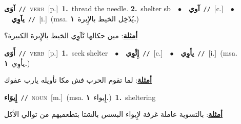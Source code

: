\documentclass[10pt,a4paper,twoside]{article} %
\begin{document}
\begin{multicols}{2}
{\setlength\topsep{0pt}\textbf{\foreignlanguage{arabic}{آوَى}}\ {\color{gray}\texttt{//}\color{black}}\ \textsc{verb}\ [p.]\ \textbf{1.}~thread the needle.  \textbf{2.}~shelter sb\ \ $\bullet$\ \ \setlength\topsep{0pt}\textbf{\foreignlanguage{arabic}{آوي}}\ {\color{gray}\texttt{//}\color{black}}\ [c.]\ \ $\bullet$\ \ \setlength\topsep{0pt}\textbf{\foreignlanguage{arabic}{يآوِي}}\ {\color{gray}\texttt{//}\color{black}}\ [i.]\ \color{gray}(msa. \foreignlanguage{arabic}{يُدْخِل الخيط بالإِبرة}~\foreignlanguage{arabic}{\textbf{١.}})\color{black}\  \begin{flushright}\color{gray}\foreignlanguage{arabic}{\textbf{\underline{\foreignlanguage{arabic}{أمثلة}}}: مين حكالها تْآوِي الخيط بالإِبرة الكبيرة؟}\end{flushright}\color{black}} \vspace{2mm}

{\setlength\topsep{0pt}\textbf{\foreignlanguage{arabic}{أَوَى}}\ {\color{gray}\texttt{//}\color{black}}\ \textsc{verb}\ [p.]\ \textbf{1.}~seek shelter\ \ $\bullet$\ \ \setlength\topsep{0pt}\textbf{\foreignlanguage{arabic}{إِئْوِي}}\ {\color{gray}\texttt{//}\color{black}}\ [c.]\ \ $\bullet$\ \ \setlength\topsep{0pt}\textbf{\foreignlanguage{arabic}{يأوِي}}\ {\color{gray}\texttt{//}\color{black}}\ [i.]\ \color{gray}(msa. \foreignlanguage{arabic}{يأوِي}~\foreignlanguage{arabic}{\textbf{١.}})\color{black}\  \begin{flushright}\color{gray}\foreignlanguage{arabic}{\textbf{\underline{\foreignlanguage{arabic}{أمثلة}}}: لما تقوم الحرب فش مكا نأويله يارب عفوك}\end{flushright}\color{black}} \vspace{2mm}

{\setlength\topsep{0pt}\textbf{\foreignlanguage{arabic}{إِيوَاء}}\ {\color{gray}\texttt{//}\color{black}}\ \textsc{noun}\ [m.]\ \color{gray}(msa. \foreignlanguage{arabic}{إِيواء}~\foreignlanguage{arabic}{\textbf{١.}})\color{black}\ \textbf{1.}~sheltering\  \begin{flushright}\color{gray}\foreignlanguage{arabic}{\textbf{\underline{\foreignlanguage{arabic}{أمثلة}}}: بالتسوية عاملة غرفة لإِيواء البسس بالشتا بتطعميهم من توالي الأكل}\end{flushright}\color{black}} \vspace{2mm}


\end{multicols}
\end{document}
